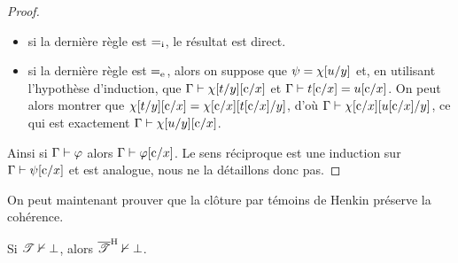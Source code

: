 \begin{proof}
\begin{itemize}
    $\varFC[v/y][\Cc/x] = \varFC[\Cc/x][v/y]$, et on peut alors déduire que
    $\varCG,\varFC[\Cc/x][v/y]\vdP \varFP[\Cc/x]$ donc en utilisant
    $\RexE$, que $\varCG\vdP \varFP[\Cc/x]$.
  \item si la dernière règle est $\mathord{=}_{\mathrm{i}}$, le résultat est direct.
  \item si la dernière règle est $\mathord{=}_{\mathrm{e}}$, alors on suppose que
    $\psi = \chi[u/y]$
    et, en utilisant l'hypothèse d'induction, que $\Gamma\vdash\chi[t/y][\mathrm{c}/x]$
    et $\Gamma\vdash t[\mathrm{c}/x] = u[\mathrm{c}/x]$. On peut alors montrer que
    $\chi[t/y][\mathrm{c}/x] = \chi[\mathrm{c}/x][t[\mathrm{c}/x]/y]$, d'où
    $\Gamma\vdash \chi[\mathrm{c}/x][u[\mathrm{c}/x]/y]$, ce
    qui est exactement $\Gamma\vdash \chi[u/y][\mathrm{c}/x]$.
  \end{itemize}
  Ainsi si $\Gamma\vdash\varphi$ alors $\Gamma\vdash\varphi[\mathrm{c}/x]$.
  Le sens réciproque est
  une induction sur $\varCG\vdP \varFP[\Cc/x]$ et est analogue,
  nous ne la détaillons donc pas.
\end{proof}

\noindent
On peut maintenant prouver que la clôture par témoins de Henkin préserve
la cohérence.

\begin{property}
  Si $\mathscr T\nvdash \bot$, alors $\overline{\mathscr T}^{\mathrm H}\nvdash\bot$.
\end{property}

